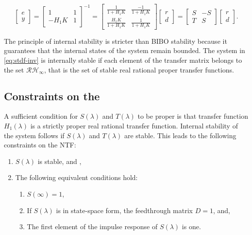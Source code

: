 \begin{equation}
	\begin{bmatrix}
		e \\
		y
	\end{bmatrix} =
	\begin{bmatrix}
		1 & 1 \\
		-H_1K & 1
	\end{bmatrix}^{-1} =
	\begin{bmatrix}
		\frac{1}{1 + H_1K} & \frac{-1}{1 + H_1K} \\
		\frac{H_1K}{1 + H_1K} & \frac{1}{1 + H_1K}
	\end{bmatrix}
	\begin{bmatrix}
		r \\
		d
	\end{bmatrix} = 
	\begin{bmatrix}
		S & -S \\
		T & S
	\end{bmatrix}
	\begin{bmatrix}
		r \\
		d
	\end{bmatrix}. \label{eq:stdf-inv}
\end{equation}

The principle of internal stability is stricter than \gls{BIBO} stability because it guarantees that the internal states of the system remain bounded. The system in \autoref{eq:stdf-inv} is internally stable if each element of the transfer matrix belongs to the set $\mathcal{R}\mathcal{H}_\infty$, that is the set of stable real rational proper transfer functions.

\subsection{Constraints on the }
\label{sec:model-ntf-constraints}

A sufficient condition for $S(\lambda)$ and $T(\lambda)$ to be proper is that transfer function $H_1(\lambda)$ is a strictly proper real rational transfer function. Internal stability of the system follows if $S(\lambda)$ and $T(\lambda)$ are stable. This leads to the following constraints on the \gls{NTF}:

\begin{enumerate}
	\item $S(\lambda)$ is stable, and \label{it:con-1},
	\item The following equivalent conditions hold: \label{it:con-2}
		\begin{enumerate}
			\item $S(\infty) = 1$,
			\item If $S(\lambda)$ is in state-space form, the feedthrough matrix $D=1$, and,
			\item The first element of the impulse response of $S(\lambda)$ is one.
		\end{enumerate}
\end{enumerate}

